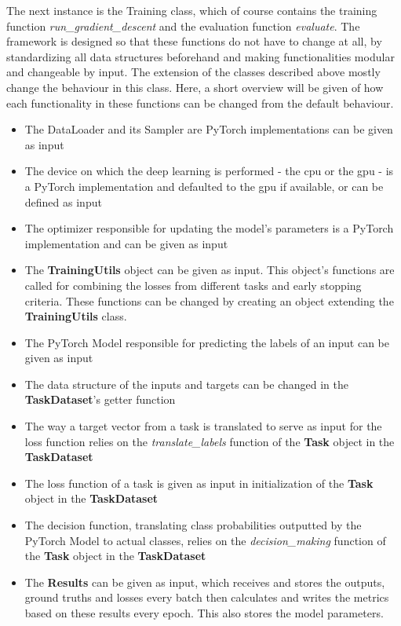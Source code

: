 The next instance is the Training class, which of course contains the training function \textit{run\_gradient\_descent} and the evaluation function \textit{evaluate}. The framework is designed so that these functions do not have to change at all, by standardizing all data structures beforehand and making functionalities modular and changeable by input. The extension of the classes described above mostly change the behaviour in this class. Here, a short overview will be given of how each functionality in these functions can be changed from the default behaviour. \\

\begin{itemize}
	\item The DataLoader and its Sampler are PyTorch implementations can be given as input
	\item The device on which the deep learning is performed - the cpu or the gpu - is a PyTorch implementation and defaulted to the gpu if available, or can be defined as input
	\item The optimizer responsible for updating the model's parameters is a PyTorch implementation and can be given as input
	\item The \textbf{TrainingUtils} object can be given as input. This object's functions are called for combining the losses from different tasks and early stopping criteria. These functions can be changed by creating an object extending the \textbf{TrainingUtils} class.
	\item The PyTorch Model responsible for predicting the labels of an input can be given as input
	\item The data structure of the inputs and targets can be changed in the \textbf{TaskDataset}'s getter function
	\item The way a target vector from a task is translated to serve as input for the loss function relies on the \textit{translate\_labels} function of the \textbf{Task} object in the \textbf{TaskDataset}
	\item The loss function of a task is given as input in initialization of the \textbf{Task} object in the \textbf{TaskDataset}
	\item The decision function, translating class probabilities outputted by the PyTorch Model to actual classes, relies on the \textit{decision\_making} function of the \textbf{Task} object in the \textbf{TaskDataset}
	\item The \textbf{Results} can be given as input, which receives and stores the outputs, ground truths and losses every batch then calculates and writes the metrics based on these results every epoch. This also stores the model parameters. 	
\end{itemize}

